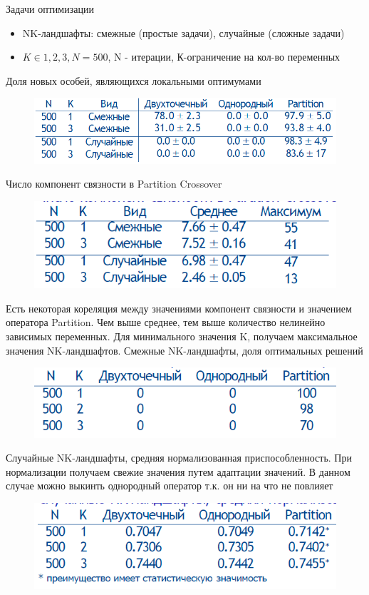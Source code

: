 Задачи оптимизации
\begin{itemize}
    \item NK-ландшафты: смежные (простые задачи), случайные (сложные задачи)
    \item $K\in{1,2,3}, N=500 $, N - итерации, К-ограничение на кол-во переменных
\end{itemize}

Доля новых особей, являющихся локальными оптимумами\\
\begin{figure}[H]
\centering
\includegraphics[width=0.8\linewidth]{images/tbl.PNG}
\end{figure}
Число компонент связности в Partition Crossover\\
\begin{figure}[H]
\centering
\includegraphics[width=0.8\linewidth]{images/tbl2.PNG}
\end{figure}
Есть некоторая кореляция между значениями компонент связности и значением оператора Partition. Чем выше среднее, тем выше количество нелинейно зависимых переменных. Для минимального значения K, получаем максимальное значения NK-ландшафтов. 
Смежные NK-ландшафты, доля оптимальных решений\\
\begin{figure}[H]
\centering
\includegraphics[width=0.8\linewidth]{images/tbl3.PNG}
\end{figure}
Случайные NK-ландшафты, средняя нормализованная приспособленность. При нормализации получаем свежие значения путем адаптации значений. В данном случае можно выкинть однородный оператор т.к. он ни на что не повлияет\\
\begin{figure}[H]
\centering
\includegraphics[width=0.8\linewidth]{images/tbl4.PNG}
\end{figure}
